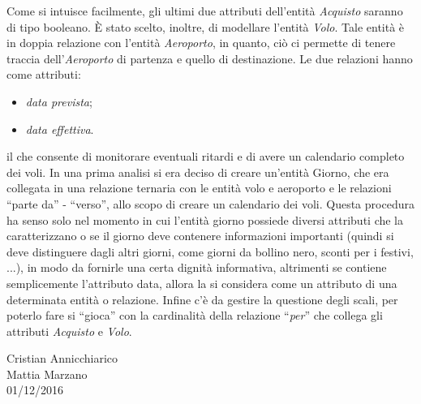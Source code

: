 Come si intuisce facilmente, gli ultimi due attributi dell’entità \textit{Acquisto} saranno di tipo booleano. È stato scelto, inoltre, di modellare l’entità \textit{Volo}. Tale entità è in doppia relazione con l’entità \textit{Aeroporto}, in quanto, ciò ci permette di tenere traccia dell'\textit{Aeroporto} di partenza e quello di destinazione. Le due relazioni hanno come attributi:

\begin{itemize}
\item \textit{data prevista};
\item \textit{data effettiva}.
\end{itemize}

il che consente di monitorare eventuali ritardi e di avere un calendario completo dei voli. In una prima analisi si era deciso di creare un’entità Giorno, che era collegata in una relazione ternaria con le entità volo e aeroporto e le relazioni “parte da” - “verso”, allo scopo di creare un calendario dei voli. Questa procedura ha senso solo nel momento in cui l’entità giorno possiede diversi attributi che la caratterizzano o se il giorno deve contenere informazioni importanti (quindi si deve distinguere dagli altri giorni, come giorni da bollino nero, sconti per i festivi, ...), in modo da fornirle una certa dignità informativa, altrimenti se contiene semplicemente l’attributo data, allora la si considera come un attributo di una determinata entità o relazione. Infine c’è da gestire la questione degli scali, per poterlo fare si “gioca” con la cardinalità della relazione “\textit{per}” che collega gli attributi \textit{Acquisto} e \textit{Volo}.


\begin{flushright}Cristian Annicchiarico\\Mattia Marzano\\01/12/2016\end{flushright}


